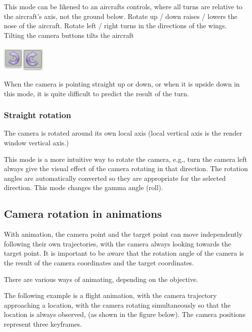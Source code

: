 This mode can be likened to an aircrafts controls, where all turns are relative
to the aircraft's axis, not the ground below. Rotate up / down raises / lowers
the nose of the aircraft. Rotate left / right turns in the directions of the
wings. Tilting the camera buttons tilts the aircraft

\includegraphics[width=0.40000in,height=0.50000in]{img/manual/media/image16.png}\includegraphics[width=0.45347in,height=0.45347in]{img/manual/media/image17.png}

When the camera is pointing straight up or down, or when it is upside down in
this mode, it is quite difficult to predict the result of the turn.

\subsubsection{Straight rotation}\label{straight-rotation}

The camera is rotated around its own local axis (local vertical axis is the
render window vertical axis.)

This mode is a more intuitive way to rotate the camera, e.g., turn the camera
left always give the visual effect of the camera rotating in that direction. The
rotation angles are automatically converted so they are appropriate for the
selected direction. This mode changes the gamma angle (roll).

\subsection{Camera rotation in animations}\label{camera-rotation-in-animations}

With animation, the camera point and the target point can move independently
following their own trajectories, with the camera always looking towards the
target point. It is important to be aware that the rotation angle of the camera
is the result of the camera coordinates and the target coordinates.

There are various ways of animating, depending on the objective.

The following example is a flight animation, with the camera trajectory
approaching a location, with the camera rotating simultaneously so that the
location is always observed, (as shown in the figure below). The camera
positions represent three keyframes.

